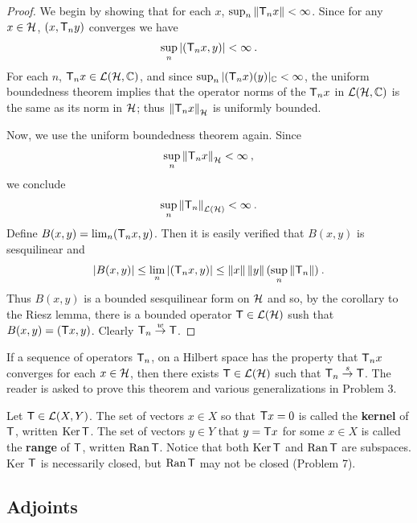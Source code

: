\begin{proof}
    We begin by showing that for each $x$, $\sup_n \left \Vert \mathsf{T}_n x \right \Vert < \infty$. Since for any $x \in \mathcal{H}$, $(x, \mathsf{T}_n y)$ converges we have \begin{align}
        \sup_n |(\mathsf{T}_n x, y)| < \infty \:.
    \end{align}
    For each $n$, $\mathsf{T}_n x \in \mathcal L(\mathcal{H}, \mathbb{C})$, and since $\sup_n |(\mathsf{T}_n x)(y)|_{\mathbb{C}} < \infty$, the uniform boundedness theorem implies that the operator norms of the $\mathsf{T}_nx$ in $\mathcal L(\mathcal{H}, \mathbb{C})$ is the same as its norm in $\mathcal{H}$; thus $\left \Vert \mathsf{T}_n x \right \Vert_{\mathcal{H}}$ is uniformly bounded.

    Now, we use the uniform boundedness theorem again. Since \begin{align}
        \sup_n \left \Vert \mathsf{T}_n x \right \Vert_{\mathcal{H}} < \infty \:,
    \end{align}
    we conclude \begin{align}
        \sup_n \left \Vert \mathsf{T}_n \right \Vert_{\mathcal L(\mathcal{H})} < \infty \:.
    \end{align}
    Define $B(x,y) = \lim_n (\mathsf{T}_n x, y)$. Then it is easily verified that $B(x,y)$ is sesquilinear and \begin{align}
        |B(x,y)| \leq \lim_n |(\mathsf{T}_n x,y)| \leq \left \Vert x \right \Vert \left \Vert y \right \Vert (\sup_n \left \Vert \mathsf{T}_n \right \Vert) \:.
    \end{align}
    Thus $B(x,y)$ is a bounded sesquilinear form on $\mathcal{H}$ and so, by the corollary to the Riesz lemma, there is a bounded operator $\mathsf{T} \in \mathcal L(\mathcal{H})$ sush that $B(x,y) = (\mathsf{T} x,y)$. Clearly $\mathsf{T}_n \overset{w}\rightarrow \mathsf{T}$.
\end{proof}

If a sequence of operators $\mathsf{T}_n$, on a Hilbert space has the property that $\mathsf{T}_n x$ converges for each $x \in \mathcal{H}$, then there exists $\mathsf{T} \in \mathcal L(\mathcal{H})$ such that $\mathsf{T}_n \overset{s}\rightarrow \mathsf{T}$. The reader is asked to prove this theorem and various generalizations in Problem 3.

Let $\mathsf{T} \in \mathcal L(X,Y)$. The set of vectors $x \in X$ so that $\mathsf{T} x = 0$ is called the \textbf{kernel} of $\mathsf{T}$, written $\mathrm{Ker}\, \mathsf{T}$. The set of vectors $y \in Y$ that $y = \mathsf{T} x$ for some $x \in X$ is called the \textbf{range} of $\mathsf{T}$, written $ \mathrm{Ran}\, \mathsf{T}$. Notice that both $\mathrm{Ker}\, \mathsf{T}$ and $\mathrm{Ran}\, \mathsf{T}$ are subspaces. Ker $\mathsf{T}$ is necessarily closed, but $\mathrm{Ran}\, \mathsf{T}$ may not be closed (Problem 7).

\subsection{Adjoints}

